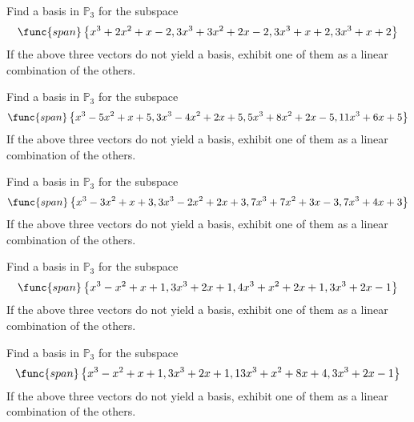 \begin{enumialphparenastyle}
\begin{ex} Find a basis in $\mathbb{P}_{3}$ for the subspace 
\begin{equation*}
\func{span}\left\{
x^{3}+2x^{2}+x-2,3x^{3}+3x^{2}+2x-2,3x^{3}+x+2,3x^{3}+x+2\right\}
\end{equation*}
If the above three vectors do not yield a basis, exhibit one of them as a
linear combination of the others.
\end{ex}


\begin{ex} Find a basis in $\mathbb{P}_{3}$ for the subspace 
\begin{equation*}
\func{span}\left\{
x^{3}-5x^{2}+x+5,3x^{3}-4x^{2}+2x+5,5x^{3}+8x^{2}+2x-5,11x^{3}+6x+5\right\}
\end{equation*}
If the above three vectors do not yield a basis, exhibit one of them as a
linear combination of the others.
\end{ex}


\begin{ex} Find a basis in $\mathbb{P}_{3}$ for the subspace 
\begin{equation*}
\func{span}\left\{
x^{3}-3x^{2}+x+3,3x^{3}-2x^{2}+2x+3,7x^{3}+7x^{2}+3x-3,7x^{3}+4x+3\right\}
\end{equation*}
If the above three vectors do not yield a basis, exhibit one
of them as a linear combination of the others.
\end{ex}


\begin{ex} Find a basis in $\mathbb{P}_{3}$ for the subspace 
\begin{equation*}
\func{span}\left\{
x^{3}-x^{2}+x+1,3x^{3}+2x+1,4x^{3}+x^{2}+2x+1,3x^{3}+2x-1\right\}
\end{equation*}
If the above three vectors do not yield a basis, exhibit one
of them as a linear combination of the others.
\end{ex}


\begin{ex} Find a basis in $\mathbb{P}_{3}$ for the subspace 
\begin{equation*}
\func{span}\left\{
x^{3}-x^{2}+x+1,3x^{3}+2x+1,13x^{3}+x^{2}+8x+4,3x^{3}+2x-1\right\}
\end{equation*}
If the above three vectors do not yield a basis, exhibit one
of them as a linear combination of the others.
\end{ex}



\end{enumialphparenastyle}
